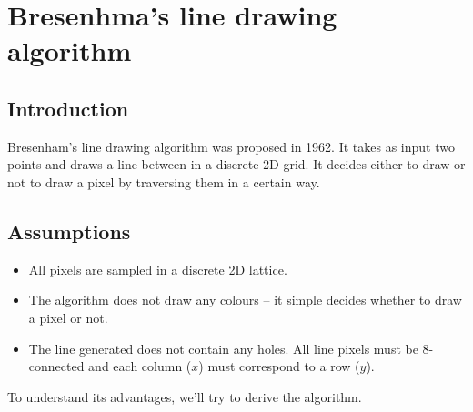 \documentclass[a4paper]{article}
\begin{document}






\newpage
\tableofcontents
\newpage



\section{Bresenhma's line drawing algorithm}


\subsection{Introduction}
Bresenham's line drawing algorithm was proposed in 1962. It takes as input two points and draws a line between in a discrete 2D grid. It decides either to draw or not to draw a pixel by traversing them in a certain way.


\subsection{Assumptions}

\begin{itemize}
	\item All pixels are sampled in a discrete 2D lattice.
	\item The algorithm does not draw any colours -- it simple decides whether to draw a pixel or not.
	\item The line generated does not contain any holes. All line pixels must be 8-connected and each column ($x$) must correspond to a row ($y$). 
\end{itemize}
To understand its advantages, we'll try to derive the algorithm.
\end{document}
